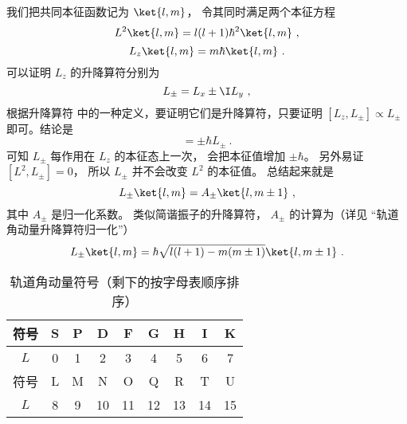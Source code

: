 我们把共同本征函数记为 $\ket{l,m}$， 令其同时满足两个本征方程
\begin{equation}
L^2\ket{l,m} = l(l+1)\hbar^2 \ket{l,m}~,
\end{equation}
\begin{equation}
L_z\ket{l,m} = m\hbar \ket{l,m}~.
\end{equation}
可以证明 $L_z$ 的升降算符分别为
\begin{equation}
L_\pm = L_x \pm \I L_y~,
\end{equation}
根据升降算符 中的一种定义，要证明它们是升降算符，只要证明 $[L_z, L_\pm] \propto L_\pm$ 即可。结论是 %
\begin{equation}
[L_z, L_\pm] =  \pm \hbar L_ \pm~.
\end{equation}
可知 $L_\pm$ 每作用在 $L_z$ 的本征态上一次， 会把本征值增加 $\pm\hbar$。 另外易证 $[L^2, L_\pm] = 0$， 所以 $L_\pm$ 并不会改变 $L^2$ 的本征值。 总结起来就是
\begin{equation}
L_\pm \ket{l,m} = A_\pm \ket{l,m \pm 1}~,
\end{equation}
其中 $A_\pm$ 是归一化系数。 类似简谐振子的升降算符， $A_\pm$ 的计算为（详见 “轨道角动量升降算符归一化”）
\begin{equation}
L_\pm \ket{l, m}  = \hbar \sqrt{l(l + 1) - m(m \pm 1)} \ket{l, m \pm 1} ~.
\end{equation}

\begin{table}[ht]
\centering
\caption{轨道角动量符号（剩下的按字母表顺序排序）}\label{tab_QOrbAM_1}
\begin{tabular}{|c|c|c|c|c|c|c|c|c|}
\hline
符号 & S & P & D & F & G & H & I & K\\
\hline
$L$ & 0 & 1 & 2 & 3 & 4 & 5 & 6 & 7\\
\hline
符号 & L & M & N & O & Q & R & T & U \\
\hline
$L$ & 8 & 9 & 10 & 11 & 12 & 13 & 14 & 15 \\
\hline
\end{tabular}
\end{table}
